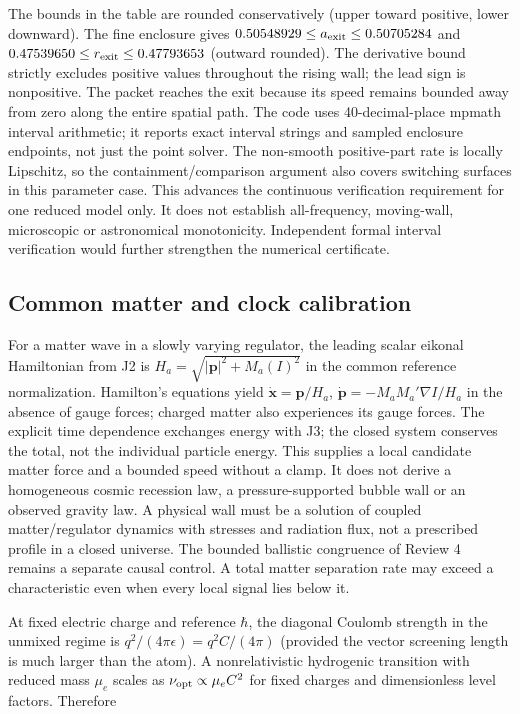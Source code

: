 \documentclass[
  11pt,
  twoside]{article}
\begin{document}
The bounds in the table are rounded conservatively (upper toward
positive, lower downward). The fine enclosure gives
\(0.50548929\leq a_{\rm exit}\leq0.50705284\) and
\(0.47539650\leq r_{\rm exit}\leq0.47793653\) (outward rounded). The
derivative bound strictly excludes positive values throughout the rising
wall; the lead sign is nonpositive. The packet reaches the exit because
its speed remains bounded away from zero along the entire spatial path.
The code uses 40-decimal-place mpmath interval arithmetic; it reports
exact interval strings and sampled enclosure endpoints, not just the
point solver. The non-smooth positive-part rate is locally Lipschitz, so
the containment/comparison argument also covers switching surfaces in
this parameter case. This advances the continuous verification
requirement for one reduced model only. It does not establish
all-frequency, moving-wall, microscopic or astronomical monotonicity.
Independent formal interval verification would further strengthen the
numerical certificate.

\subsection{Common matter and clock
calibration}\label{common-matter-and-clock-calibration}

For a matter wave in a slowly varying regulator, the leading scalar
eikonal Hamiltonian from J2 is \(H_a=\sqrt{|\mathbf p|^2+M_a(I)^2}\) in
the common reference normalization. Hamilton's equations yield
\(\dot{\mathbf x}=\mathbf p/H_a\),
\(\dot{\mathbf p}=-M_aM_a'\nabla I/H_a\) in the absence of gauge forces;
charged matter also experiences its gauge forces. The explicit time
dependence exchanges energy with J3; the closed system conserves the
total, not the individual particle energy. This supplies a local
candidate matter force and a bounded speed without a clamp. It does not
derive a homogeneous cosmic recession law, a pressure-supported bubble
wall or an observed gravity law. A physical wall must be a solution of
coupled matter/regulator dynamics with stresses and radiation flux, not
a prescribed profile in a closed universe. The bounded ballistic
congruence of Review 4 remains a separate causal control. A total matter
separation rate may exceed a characteristic even when every local signal
lies below it.

At fixed electric charge and reference \(\hbar\), the diagonal Coulomb
strength in the unmixed regime is \(q^2/(4\pi\epsilon)=q^2C/(4\pi)\)
(provided the vector screening length is much larger than the atom). A
nonrelativistic hydrogenic transition with reduced mass \(\mu_e\) scales
as \(\nu_{\rm opt}\propto\mu_e C^2\) for fixed charges and dimensionless
level factors. Therefore
\end{document}
